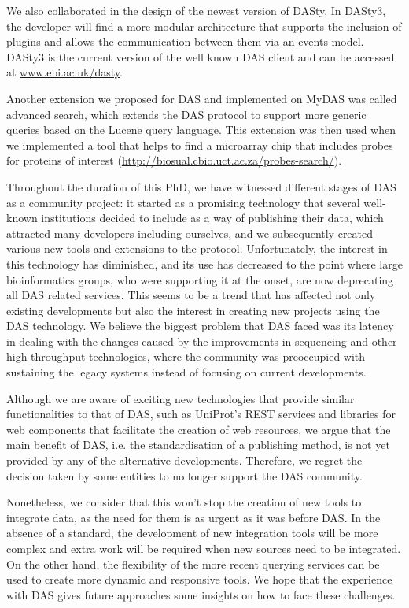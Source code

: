 We also collaborated in the design of the newest version of DASty. In DASty3, the developer will find a more modular architecture that supports the inclusion of plugins and allows the communication between them via an events model. DASty3 is the current version of the well known DAS client and can be accessed at \url{www.ebi.ac.uk/dasty}.

Another extension we proposed for DAS and implemented on MyDAS was called advanced search, which extends the DAS  protocol to support more generic queries based on the Lucene query language. This extension was then used when we implemented a tool that helps to find a microarray chip that includes probes for proteins of interest (\url{http://biosual.cbio.uct.ac.za/probes-search/}).

Throughout the duration of this PhD, we have witnessed different stages of DAS as a community project: it started as a promising technology that several well-known institutions decided to include as a way of publishing their data, which attracted many developers including ourselves, and we subsequently created various new tools and extensions to the protocol. Unfortunately, the interest in this technology has diminished, and its use has decreased to the point where large bioinformatics groups, who were supporting it at the onset, are now deprecating all DAS related services.
This seems to be a trend that has affected not only existing developments but also the interest in creating new projects using the DAS technology. We believe the biggest problem that DAS faced was its latency in dealing with the changes caused by the improvements in sequencing and other high throughput technologies, where the community was preoccupied with sustaining the legacy systems instead of focusing on current developments.

Although we are aware of exciting new technologies that provide similar functionalities to that of DAS, such as UniProt's REST services and libraries for web components that facilitate the creation of web resources, we argue that the main benefit of DAS, i.e. the standardisation of a publishing method, is not yet provided by any of the alternative developments.  Therefore, we regret the decision taken by some entities to no longer support the DAS community.

Nonetheless, we consider that this won't stop the creation of new tools to integrate data, as the need for them is as urgent as it was before DAS. In the absence of a standard, the development of new integration tools will be more complex and extra work will be required when new sources need to be integrated. On the other hand, the flexibility of the more recent querying services can be used to create more dynamic and responsive tools. We hope that the experience with DAS gives future approaches some insights on how to face these challenges.

